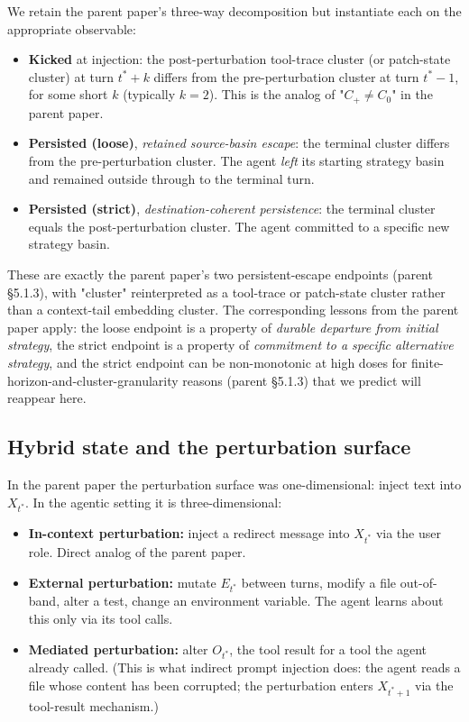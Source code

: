 \documentclass{article}
\theoremstyle{plain}
\theoremstyle{definition}
\begin{document}
We retain the parent paper's three-way decomposition but instantiate each on the appropriate observable:

\begin{itemize}
  \item \textbf{Kicked} at injection: the post-perturbation tool-trace cluster (or patch-state cluster) at turn $t^* + k$ differs from the pre-perturbation cluster at turn $t^* - 1$, for some short $k$ (typically $k=2$). This is the analog of "$C_+ \ne C_0$" in the parent paper.
  \item \textbf{Persisted (loose)}, \textit{retained source-basin escape}: the terminal cluster differs from the pre-perturbation cluster. The agent \textit{left} its starting strategy basin and remained outside through to the terminal turn.
  \item \textbf{Persisted (strict)}, \textit{destination-coherent persistence}: the terminal cluster equals the post-perturbation cluster. The agent committed to a specific new strategy basin.
\end{itemize}

These are exactly the parent paper's two persistent-escape endpoints (parent §5.1.3), with "cluster" reinterpreted as a tool-trace or patch-state cluster rather than a context-tail embedding cluster. The corresponding lessons from the parent paper apply: the loose endpoint is a property of \textit{durable departure from initial strategy}, the strict endpoint is a property of \textit{commitment to a specific alternative strategy}, and the strict endpoint can be non-monotonic at high doses for finite-horizon-and-cluster-granularity reasons (parent §5.1.3) that we predict will reappear here.

\subsection{Hybrid state and the perturbation surface}

In the parent paper the perturbation surface was one-dimensional: inject text into $X_{t^*}$. In the agentic setting it is three-dimensional:

\begin{itemize}
  \item \textbf{In-context perturbation:} inject a redirect message into $X_{t^*}$ via the user role. Direct analog of the parent paper.
  \item \textbf{External perturbation:} mutate $E_{t^*}$ between turns, modify a file out-of-band, alter a test, change an environment variable. The agent learns about this only via its tool calls.
  \item \textbf{Mediated perturbation:} alter $O_{t^*}$, the tool result for a tool the agent already called. (This is what indirect prompt injection does: the agent reads a file whose content has been corrupted; the perturbation enters $X_{t^*+1}$ via the tool-result mechanism.)
\end{itemize}
\end{document}
